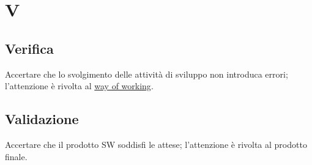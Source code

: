 \section{V}

    \subsection{Verifica}
    \label{glossario:verifica}
    Accertare che lo svolgimento delle attività di sviluppo non introduca errori; l'attenzione è rivolta al \hyperref[glossario:wayofworking]{way of working}.

    \subsection{Validazione}
    \label{glossario:validazione}
    Accertare che il prodotto SW soddisfi le attese; l'attenzione è rivolta al prodotto finale.

\pagebreak